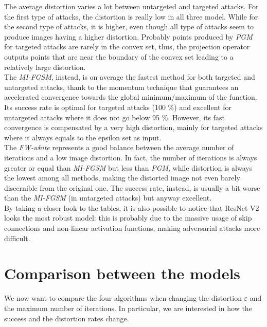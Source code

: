 \documentclass[10pt,twocolumn,letterpaper, english]{article}
\theoremstyle{definition}
\theoremstyle{plain}
\theoremstyle{plain}
\theoremstyle{plain}
\theoremstyle{plain}
\theoremstyle{remark}
\theoremstyle{remark}
\theoremstyle{definition}
\theoremstyle{definition}
\theoremstyle{definition}
\theoremstyle{definition}
\renewcommand{\epsilon}{\varepsilon}
\begin{document}
The average distortion varies a lot between untargeted and targeted attacks. 
For the first type of attacks, the distortion is really low in all three model.
While for the second type of attacks, it is higher, even though all type of attacks seem to produce images having a higher distortion.
Probably points produced by \textit{PGM} for targeted attacks are rarely in the convex set, thus, the projection operator outputs points that are near the boundary of the convex set leading to a relatively large distortion. \\

The \textit{MI-FGSM}, instead, is on average the fastest method for both targeted and untargeted attacks, thank to the momentum technique that guarantees an  accelerated convergence towards the global minimum/maximum of the function. Its success rate is optimal for targeted attacks (100 \%) and excellent for untargeted attacks where it does not go below 95 \%. However, its fast convergence is compensated by a very high distortion, mainly for targeted attacks where it always equals to the epsilon set as input.\\

The \textit{FW-white} represents a good balance between the average number of iterations and a low image distortion.
In fact, the number of iterations is always greater or equal than \textit{MI-FGSM} but less than \textit{PGM}, while distortion is always the lowest among all methods, making the distorted image not even barely discernible from the original one. The success rate, instead, is usually a bit worse than the \textit{MI-FGSM} (in untargeted attacks) but anyway excellent. \\

By taking a closer look to the tables, it is also possible to notice that ResNet V2 looks the most robust model: this is probably due to the massive usage of skip connections and non-linear activation functions, making adversarial attacks more difficult.

\section{Comparison between the models} 
\label{section:graphs}

We now want to compare the four algorithms when changing the distortion $\epsilon$ and the maximum number of iterations. 
In particular, we are interested in how the success and the distortion rates change. 
\end{document}
